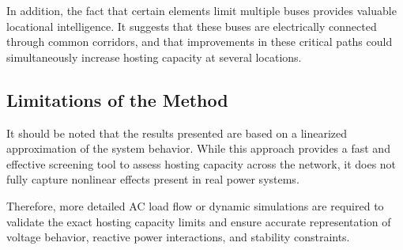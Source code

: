 In addition, the fact that certain elements limit multiple buses provides valuable locational intelligence. It suggests that these buses are electrically connected through common corridors, and that improvements in these critical paths could simultaneously increase hosting capacity at several locations.

\subsection{Limitations of the Method}

It should be noted that the results presented are based on a linearized approximation of the system behavior. While this approach provides a fast and effective screening tool to assess hosting capacity across the network, it does not fully capture nonlinear effects present in real power systems.

Therefore, more detailed AC load flow or dynamic simulations are required to validate the exact hosting capacity limits and ensure accurate representation of voltage behavior, reactive power interactions, and stability constraints.

